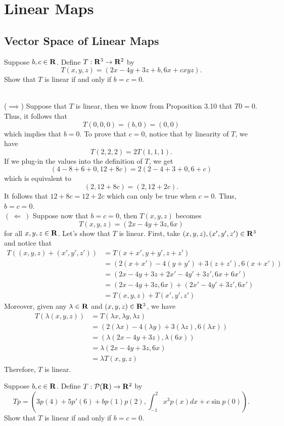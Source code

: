 \chapter{Linear Maps}

\section{Vector Space of Linear Maps}

\begin{exercise}
    Suppose $b,c \in \mathbf{R}$. Define $T: \mathbf{R}^3 \to \mathbf{R}^2$ by
    $$T(x,y,z) = (2x-4y + 3z + b, 6x + cxyz).$$
    Show that $T$ is linear if and only if $b = c = 0$. \\
\end{exercise}

\begin{solution}
    \\ ($\implies$) Suppose that $T$ is linear, then we know from Proposition 3.10 that $T0 = 0$. Thus, it follows that
    $$T(0,0,0) = (b, 0) = (0,0)$$
    which implies that $b = 0$. To prove that $c = 0$, notice that by linearity of $T$, we have
    $$T(2,2,2) = 2T(1,1,1).$$
    If we plug-in the values into the definition of $T$, we get
    $$(4 - 8 + 6 + 0, 12 + 8c) = 2(2 - 4 + 3 + 0, 6 + c)$$
    which is equivalent to
    $$(2, 12 + 8c) = (2, 12 + 2c).$$
    It follows that $12 + 8c = 12 + 2c$ which can only be true when $c = 0$. Thus, $b = c = 0$. \\
    $( \ \Longleftarrow \ )$ Suppose now that $b = c = 0$, then $T(x,y,z)$ becomes
    $$T(x,y,z) = (2x-4y + 3z, 6x)$$
    for all $x,y,z \in \mathbf{R}$. Let's show that $T$ is linear. First, take $(x,y,z), (x',y',z') \in \mathbf{R}^3$ and notice that
    \begin{align*}
        T((x,y,z) + (x',y',z')) &= T(x+x', y+y', z+z') \\
        &= (2(x + x')-4(y+y') + 3(z+z'), 6(x+x')) \\
        &= (2x - 4y + 3z + 2x' - 4y' + 3z', 6x + 6x') \\
        &= (2x-4y + 3z, 6x) + (2x'-4y' + 3z', 6x') \\
        &= T(x,y,z) + T(x',y',z')
    \end{align*}
    Moreover, given any $\lambda \in \mathbf{R}$ and $(x,y,z) \in \mathbf{R}^3$, we have
    \begin{align*}
        T(\lambda(x,y,z)) &= T(\lambda x, \lambda y, \lambda z) \\
        &= (2(\lambda x)-4(\lambda y) + 3(\lambda z), 6(\lambda x)) \\
        &= (\lambda(2x - 4y + 3z), \lambda(6x)) \\
        &= \lambda(2x - 4y + 3z, 6x) \\
        &= \lambda T(x,y,z)
    \end{align*}
    Therefore, $T$ is linear.\\
\end{solution}

\begin{exercise}
    Suppose $b,c \in \mathbf{R}$. Define $T : \mathcal{P}(\mathbf{R}) \to \mathbf{R}^2$ by
    $$Tp = \left(3p(4) + 5p'(6) + bp(1)p(2), \int_{-1}^{2}x^3p(x)dx + c \sin p(0) \right).$$
    Show that $T$ is linear if and only if $b = c = 0$. \\
\end{exercise}

\begin{solution}
    \\ \td \\
\end{solution}